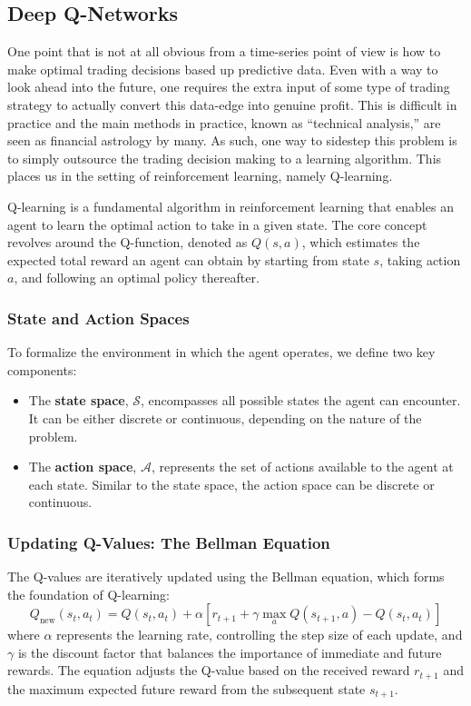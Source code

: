 \documentclass{article}
\begin{document}
\subsection{Deep Q-Networks}


One point that is not at all obvious from a time-series point of view is how to make optimal trading decisions based up predictive data. Even with a way to look ahead into the future, one requires the extra input of some type of trading strategy to actually convert this data-edge into genuine profit. This is difficult in practice and the main methods in practice, known as ``technical analysis,'' are seen as financial astrology by many. As such, one way to sidestep this problem is to simply outsource the trading decision making to a learning algorithm. This places us in the setting of reinforcement learning, namely Q-learning.


Q-learning is a fundamental algorithm in reinforcement learning that enables an agent to learn the optimal action to take in a given state. The core concept revolves around the Q-function, denoted as $Q(s, a)$, which estimates the expected total reward an agent can obtain by starting from state $s$, taking action $a$, and following an optimal policy thereafter.

\subsubsection{State and Action Spaces}

To formalize the environment in which the agent operates, we define two key components:
\begin{itemize}
  \item The \textbf{state space}, $\mathcal{S}$, encompasses all possible states the agent can encounter. It can be either discrete or continuous, depending on the nature of the problem.
  \item The \textbf{action space}, $\mathcal{A}$, represents the set of actions available to the agent at each state. Similar to the state space, the action space can be discrete or continuous.
\end{itemize}

\subsubsection{Updating Q-Values: The Bellman Equation}

The Q-values are iteratively updated using the Bellman equation, which forms the foundation of Q-learning:
\begin{equation}
  Q_{\text{new}}(s_t, a_t) = Q(s_t, a_t) + \alpha \left[r_{t+1} + \gamma \max_{a} Q(s_{t+1}, a) - Q(s_t, a_t)\right]
\end{equation}
where $\alpha$ represents the learning rate, controlling the step size of each update, and $\gamma$ is the discount factor that balances the importance of immediate and future rewards. The equation adjusts the Q-value based on the received reward $r_{t+1}$ and the maximum expected future reward from the subsequent state $s_{t+1}$.
\end{document}

